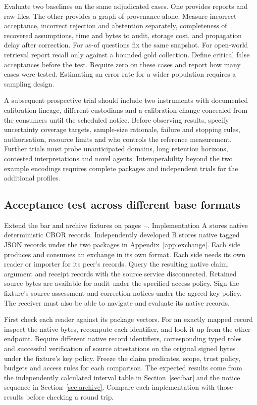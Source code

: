 \documentclass[11pt,a4paper]{article}
\begin{document}
Evaluate two baselines on the same adjudicated cases. One provides reports and raw files. The other provides a graph of provenance alone. Measure incorrect acceptance, incorrect rejection and abstention separately, completeness of recovered assumptions, time and bytes to audit, storage cost, and propagation delay after correction. For as-of questions fix the same snapshot. For open-world retrieval report recall only against a bounded gold collection. Define critical false acceptances before the test. Require zero on these cases and report how many cases were tested. Estimating an error rate for a wider population requires a sampling design.

A subsequent prospective trial should include two instruments with documented calibration lineage, different custodians and a calibration change concealed from the consumers until the scheduled notice. Before observing results, specify uncertainty coverage targets, sample-size rationale, failure and stopping rules, authorisation, resource limits and who controls the reference measurement. Further trials must probe unanticipated domains, long retention horizons, contested interpretations and novel agents. Interoperability beyond the two example encodings requires complete packages and independent trials for the additional profiles.

\clearpage
{}
\subsection*{Acceptance test across different base formats}\label{sec:trial}
Extend the bar and archive fixtures on pages~\pageref{sec:rivals}--\pageref{sec:bar}. Implementation A stores native deterministic CBOR records. Independently developed B stores native tagged JSON records under the two packages in Appendix~\ref{app:exchange}. Each side produces and consumes an exchange in its own format. Each side needs its own reader or importer for its peer's records. Query the resulting native claim, argument and receipt records with the source service disconnected. Retained source bytes are available for audit under the specified access policy. Sign the fixture's source assessment and correction notices under the agreed key policy. The receiver must also be able to navigate and evaluate its native records.

First check each reader against its package vectors. For an exactly mapped record inspect the native bytes, recompute each identifier, and look it up from the other endpoint. Require different native record identifiers, corresponding typed roles and successful verification of source attestations on the original signed bytes under the fixture's key policy. Freeze the claim predicates, scope, trust policy, budgets and access rules for each comparison. The expected results come from the independently calculated interval table in Section~\ref{sec:bar} and the notice sequence in Section~\ref{sec:archive}. Compare each implementation with those results before checking a round trip.
\end{document}
